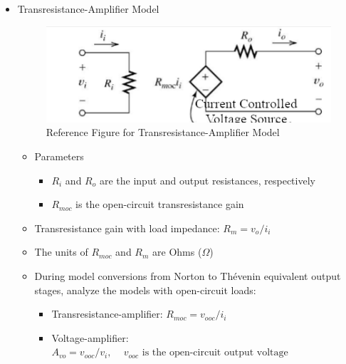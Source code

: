 \begin{itemize}
\begin{itemize}
    \end{itemize}

  \item Transresistance-Amplifier Model

    \begin{figure}[H]
      \centering
      \includegraphics[width=.7\textwidth]{Images/TransResAmp.png}
      \caption{Reference Figure for Transresistance-Amplifier Model}
      \label{fig:4}
    \end{figure}

    \begin{itemize}

      \item Parameters

        \begin{itemize}

          \item $R_i$ and $R_o$ are the input and output resistances, respectively

          \item $R_{moc}$ is the open-circuit transresistance gain

        \end{itemize}

      \item Transresistance gain with load impedance: $R_m=v_o/i_i$

      \item The units of $R_{moc}$ and $R_m$ are Ohms ($\Omega$)

      \item During model conversions from Norton to Th\'evenin equivalent output stages, analyze the models with open-circuit loads:

        \begin{itemize}

          \item Transresistance-amplifier: $R_{moc}=v_{ooc}/i_i$

          \item Voltage-amplifier: $A_{vo}=v_{ooc}/v_i,\,\quad v_{ooc}\text{ is the open-circuit output voltage}$

        \end{itemize}


\end{itemize}
\end{itemize}
